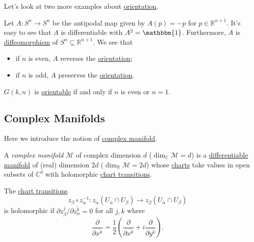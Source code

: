 Let's look at two more examples about \hyperref[def:orientation]{orientation}.

\begin{eg}
	Let \(A\colon S^n \to  S^n\) be the antipodal map given by \(A(p) = -p\) for \(p\in \mathbb{R} ^{n+1}\). It's easy to see that \(A\) is differentiable with \(A^2 = \mathbbm{1} \). Furthermore, \(A\) is \hyperref[def:diffeomorphism]{diffeomorphism} of \(S^n \subseteq \mathbb{R} ^{n+1}\). We see that
	\begin{itemize}
		\item if \(n\) is even, \(A\) reverses the \hyperref[def:orientation]{orientation};
		\item if \(n\) is odd, \(A\) preserves the \hyperref[def:orientation]{orientation}.
	\end{itemize}
\end{eg}

\begin{eg}
	\(G(k, n)\) is \hyperref[def:orientation]{orientable} if and only if \(n\) is even or \(n=1\).
\end{eg}

\subsection{Complex Manifolds}
Here we introduce the notion of \hyperref[def:complex-manifold]{complex manifold}.

\begin{definition}\label{def:complex-manifold}
	A \emph{complex manifold} \(\mathcal{M} \) of complex dimension \(d\) (\(\dim _{\mathbb{C} }\mathcal{M} = d\)) is a \hyperref[def:smooth-manifold]{differentiable manifold} of (real) dimension \(2d\) (\(\dim _\mathbb{R} \mathcal{M} =2d\)) whose \hyperref[def:coordinate-chart]{charts} take values in open subsets of \(\mathbb{C} ^d\) with holomorphic \hyperref[def:coordinate-transition]{chart transitions}.
\end{definition}

\begin{prev}
	The \hyperref[def:coordinate-transition]{chart transitions}
	\[
		z_\beta \circ z_\alpha ^{-1} \colon z_\alpha (U_\alpha \cap U_\beta ) \to  z_\beta (U_\alpha \cap U_\beta )
	\]
	is holomorphic if \(\partial z_\beta ^j / \partial \overline{z_\alpha ^k} = 0\) for all \(j, k\) where
	\[
		\frac{\partial }{\partial \overline{x^k}} = \frac{1}{2} \left( \frac{\partial }{\partial \overline{x^k}} + i \frac{\partial }{\partial \overline{y^k}} \right).
	\]
\end{prev}

